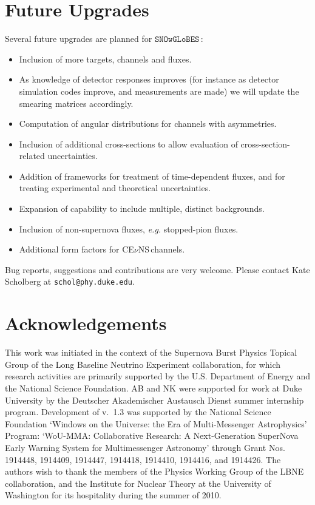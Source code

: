 \documentclass{article}
\newcommand{\cev}{CE$\nu$NS\,}
\newcommand{\snow}{\texttt{SNOwGLoBES}\,}
\begin{document}
\section{Future Upgrades} \label{sec:future}

Several future upgrades are planned for $\snow$:

\begin{itemize}
    \item Inclusion of more targets, channels and fluxes.
    \item As knowledge of detector responses improves (for instance as detector simulation codes improve, and measurements are made) we will update the smearing matrices accordingly.
    \item Computation of angular distributions for channels with asymmetries.
    \item Inclusion of additional cross-sections to allow evaluation of cross-section-related uncertainties.
    \item Addition of frameworks for treatment of time-dependent fluxes, and for treating experimental and theoretical uncertainties.
    \item Expansion of capability to include multiple, distinct backgrounds.
    \item Inclusion of non-supernova fluxes, \textit{e.g.} stopped-pion fluxes.
    \item Additional form factors for \cev channels.
\end{itemize}

Bug reports, suggestions and contributions are very welcome.  Please
contact Kate Scholberg at \texttt{schol@phy.duke.edu}.


\section{Acknowledgements}
This work was initiated in the context of the Supernova Burst Physics Topical Group of the
Long Baseline Neutrino Experiment collaboration, for which research activities are primarily supported by the U.S. Department of Energy and the National Science Foundation. AB and NK were supported for work at Duke University by the Deutscher Akademischer Austausch Dienst summer internship program. Development of v.~1.3 was supported by the National Science Foundation `Windows on the Universe: the Era of Multi-Messenger Astrophysics' Program: `WoU-MMA: Collaborative Research: A Next-Generation SuperNova Early Warning System for Multimessenger Astronomy' through Grant Nos. 1914448, 1914409, 1914447, 1914418, 1914410, 1914416, and 1914426. The authors wish to thank the members of the Physics Working Group of the LBNE collaboration, and the Institute for Nuclear Theory at the University of Washington for its hospitality during the summer of 2010.
\end{document}
